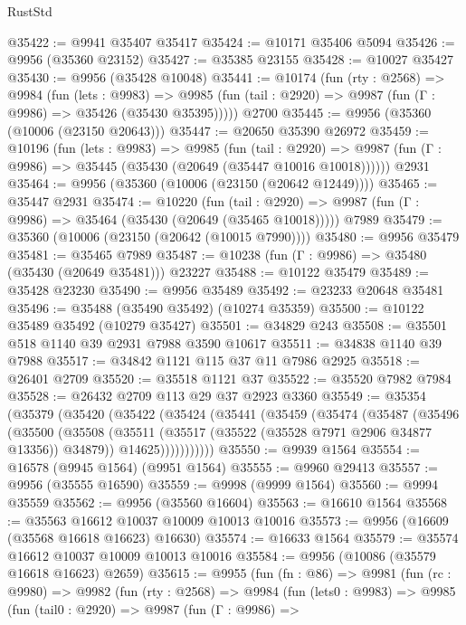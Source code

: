 \begin{lexlean}{RustStd}
\begin{coremodule}
@35422 := @9941 @35407 @35417
@35424 := @10171 @35406 @5094
@35426 := @9956 (@35360 @23152)
@35427 := @35385 @23155
@35428 := @10027 @35427
@35430 := @9956 (@35428 @10048)
@35441 := @10174
    (fun (rty : @2568) =>
    @9984
      (fun (lets : @9983) =>
      @9985 (fun (tail : @2920) => @9987 (fun (Γ : @9986) => @35426 (@35430 @35395)))))
    @2700
@35445 := @9956 (@35360 (@10006 (@23150 @20643)))
@35447 := @20650 @35390 @26972
@35459 := @10196
    (fun (lets : @9983) =>
    @9985
      (fun (tail : @2920) =>
      @9987 (fun (Γ : @9986) => @35445 (@35430 (@20649 (@35447 @10016 @10018))))))
    @2931
@35464 := @9956 (@35360 (@10006 (@23150 (@20642 @12449))))
@35465 := @35447 @2931
@35474 := @10220
    (fun (tail : @2920) => @9987 (fun (Γ : @9986) => @35464 (@35430 (@20649 (@35465 @10018)))))
    @7989
@35479 := @35360 (@10006 (@23150 (@20642 (@10015 @7990))))
@35480 := @9956 @35479
@35481 := @35465 @7989
@35487 := @10238 (fun (Γ : @9986) => @35480 (@35430 (@20649 @35481))) @23227
@35488 := @10122 @35479
@35489 := @35428 @23230
@35490 := @9956 @35489
@35492 := @23233 @20648 @35481
@35496 := @35488 (@35490 @35492) (@10274 @35359)
@35500 := @10122 @35489 @35492 (@10279 @35427)
@35501 := @34829 @243
@35508 := @35501 @518 @1140 @39 @2931 @7988 @3590 @10617
@35511 := @34838 @1140 @39 @7988
@35517 := @34842 @1121 @115 @37 @11 @7986 @2925
@35518 := @26401 @2709
@35520 := @35518 @1121 @37
@35522 := @35520 @7982 @7984
@35528 := @26432 @2709 @113 @29 @37 @2923 @3360
@35549 := @35354
    (@35379
      (@35420
        (@35422
          (@35424
            (@35441
              (@35459
                (@35474
                  (@35487
                    (@35496
                      (@35500
                        (@35508
                          (@35511 (@35517 (@35522 (@35528 @7971 @2906 @34877 @13356)) @34879))
                          @14625)))))))))))
@35550 := @9939 @1564
@35554 := @16578 (@9945 @1564) (@9951 @1564)
@35555 := @9960 @29413
@35557 := @9956 (@35555 @16590)
@35559 := @9998 (@9999 @1564)
@35560 := @9994 @35559
@35562 := @9956 (@35560 @16604)
@35563 := @16610 @1564
@35568 := @35563 @16612 @10037 @10009 @10013 @10016
@35573 := @9956 (@16609 (@35568 @16618 @16623) @16630)
@35574 := @16633 @1564
@35579 := @35574 @16612 @10037 @10009 @10013 @10016
@35584 := @9956 (@10086 (@35579 @16618 @16623) @2659)
@35615 := @9955
    (fun (fn : @86) =>
    @9981
      (fun (rc : @9980) =>
      @9982
        (fun (rty : @2568) =>
        @9984
          (fun (lets0 : @9983) =>
          @9985
            (fun (tail0 : @2920) =>
            @9987
              (fun (Γ : @9986) =>

\end{coremodule}
\end{lexlean}
